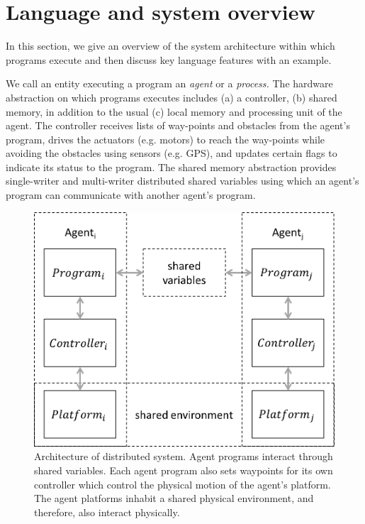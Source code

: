 \section{Language and system overview}
\label{sect:Overview}
In this section, we give an overview of the system architecture within which \rolang programs execute and then discuss key language features with an example.

We call an entity executing a \rolang program an {\em agent\/} or a {\em process.\/}
The hardware abstraction on which \rolang programs executes includes (a) a controller, (b) shared memory, in addition to the usual (c) local memory and processing unit of the agent.  
%
The controller receives lists of way-points and obstacles from the agent's program, drives the actuators (e.g. motors) to reach the way-points while avoiding the obstacles using sensors (e.g. GPS), and updates certain flags to indicate its status to the program.
%
The shared memory abstraction provides single-writer and multi-writer distributed shared variables using which an agent's program can communicate with another agent's program. 

\begin{figure}[t!]
	\centering
	\includegraphics[scale=0.4]{figs/arch.png}
	\caption{\small Architecture of distributed system. Agent programs interact through shared variables. Each agent program also sets waypoints for its own controller which control the physical motion of the agent's platform. The agent platforms inhabit a shared physical environment, and therefore, also interact physically.}
	\label{fig:arch}
\end{figure}


